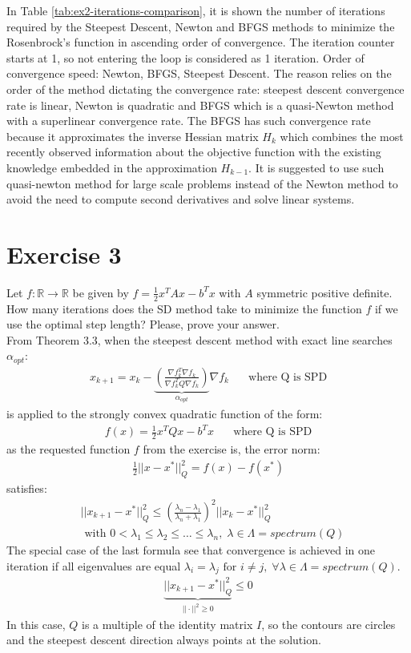 \documentclass[unicode,11pt,a4paper,oneside,numbers=endperiod,openany]{scrartcl}
\newcommand{\myex}[1]{\begin{equation*}\begin{aligned} #1 \end{aligned}\end{equation*}}
\begin{document}
In Table \ref{tab:ex2-iterations-comparison}, it is shown the number of iterations required by
the Steepest Descent, Newton and BFGS methods to minimize the Rosenbrock's function 
in ascending order of convergence.
The iteration counter starts at 1, so not entering the loop is considered as 1 iteration.
Order of convergence speed: Newton, BFGS, Steepest Descent.
The reason relies on the order of the method dictating the convergence rate:
steepest descent convergence rate is linear, 
Newton is quadratic 
and BFGS which is a quasi-Newton method with a superlinear convergence rate.
The BFGS has such convergence rate because it approximates the inverse Hessian matrix $H_k$ 
which combines the most recently observed information about the objective function 
with the existing knowledge embedded in the approximation $H_{k-1}$.
It is suggested to use such quasi-newton method for large scale problems instead of the Newton method
to avoid the need to compute second derivatives and solve linear systems.
\clearpage

\section*{Exercise 3}
Let 
$f : \mathbb{R} \rightarrow \mathbb{R}$ 
be given by 
$f = \frac{1}{2} x^T Ax - b^T x$ 
with $A$ symmetric positive definite. 
How many iterations does the SD method take to minimize the function $f$ 
if we use the optimal step length? 
Please, prove your answer.
\\\newline
From Theorem 3.3, when the steepest descent method with exact line searches $\alpha_{opt}$:
\myex{
    x_{k+1} = x_k 
        - \underbrace{
            \left( 
                \frac{\nabla f_k^T \nabla f_k}{\nabla f_k^T Q \nabla f_k} 
            \right)
        }_{\alpha_{opt}} 
        \nabla f_k 
        \;\;\;\;\;\text{ where Q is SPD} 
}
is applied to the strongly convex quadratic function of the form:
\myex{
    f(x) = \frac{1}{2} x^T Q x - b^T x
    \;\;\;\;\;\text{ where Q is SPD} 
}
as the requested function $f$ from the exercise is, 
the error norm:
\myex{
    \frac{1}{2} ||x - x^*||_Q^2 = f(x) - f(x^*)
}
satisfies:
\myex{
    & ||x_{k+1} - x^*||_Q^2 
    \leq 
    \left( 
        \frac{\lambda_{n} - \lambda_{1}}{\lambda_{n} + \lambda_{1}} 
    \right)^2 
    ||x_k - x^*||_Q^2
    \\
    & \text{ with }
    0 < \lambda_1 \leq \lambda_2 \leq \ldots \leq \lambda_n,\;
    \lambda \in \Lambda = spectrum(Q)
}
The special case of the last formula see that convergence is achieved in one iteration
if all eigenvalues are equal 
$\lambda_i = \lambda_j \text{ for } i \neq j,\; \forall \lambda \in \Lambda = spectrum(Q)$.
\myex{
    \underbrace{||x_{k+1} - x^*||_Q^2}_{||\cdot||^2 \geq 0} 
    \leq 0
}
In this case, $Q$ is a multiple of the identity matrix $I$, 
so the contours are circles and the steepest descent direction always points at the solution.
\end{document}

